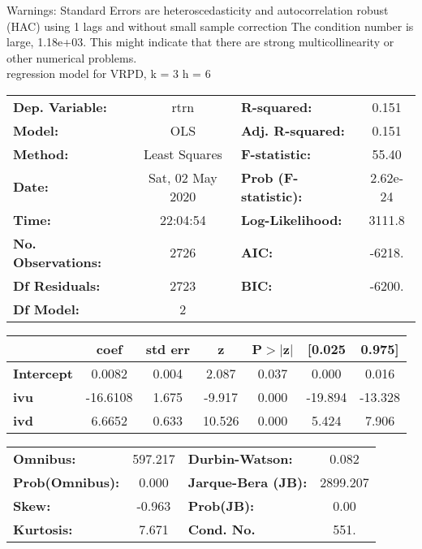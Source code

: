 Warnings: \newline
 [1] Standard Errors are heteroscedasticity and autocorrelation robust (HAC) using 1 lags and without small sample correction \newline
 [2] The condition number is large, 1.18e+03. This might indicate that there are \newline
 strong multicollinearity or other numerical problems.\\ 

regression model for VRPD, k = 3 h = 6\begin{center}
\begin{tabular}{lclc}
\toprule
\textbf{Dep. Variable:}    &       rtrn       & \textbf{  R-squared:         } &     0.151   \\
\textbf{Model:}            &       OLS        & \textbf{  Adj. R-squared:    } &     0.151   \\
\textbf{Method:}           &  Least Squares   & \textbf{  F-statistic:       } &     55.40   \\
\textbf{Date:}             & Sat, 02 May 2020 & \textbf{  Prob (F-statistic):} &  2.62e-24   \\
\textbf{Time:}             &     22:04:54     & \textbf{  Log-Likelihood:    } &    3111.8   \\
\textbf{No. Observations:} &        2726      & \textbf{  AIC:               } &    -6218.   \\
\textbf{Df Residuals:}     &        2723      & \textbf{  BIC:               } &    -6200.   \\
\textbf{Df Model:}         &           2      & \textbf{                     } &             \\
\bottomrule
\end{tabular}
\begin{tabular}{lcccccc}
                   & \textbf{coef} & \textbf{std err} & \textbf{z} & \textbf{P$> |$z$|$} & \textbf{[0.025} & \textbf{0.975]}  \\
\midrule
\textbf{Intercept} &       0.0082  &        0.004     &     2.087  &         0.037        &        0.000    &        0.016     \\
\textbf{ivu}       &     -16.6108  &        1.675     &    -9.917  &         0.000        &      -19.894    &      -13.328     \\
\textbf{ivd}       &       6.6652  &        0.633     &    10.526  &         0.000        &        5.424    &        7.906     \\
\bottomrule
\end{tabular}
\begin{tabular}{lclc}
\textbf{Omnibus:}       & 597.217 & \textbf{  Durbin-Watson:     } &    0.082  \\
\textbf{Prob(Omnibus):} &   0.000 & \textbf{  Jarque-Bera (JB):  } & 2899.207  \\
\textbf{Skew:}          &  -0.963 & \textbf{  Prob(JB):          } &     0.00  \\
\textbf{Kurtosis:}      &   7.671 & \textbf{  Cond. No.          } &     551.  \\
\bottomrule
\end{tabular}
\end{center}

